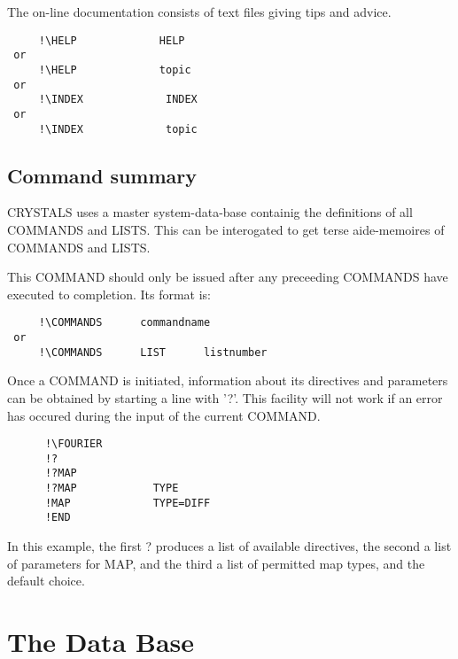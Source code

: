 \documentclass[10pt,a4paper]{report}
\begin{document}
The on-line documentation consists of text files giving tips and
advice.

\small\begin{verbatim}
     !\HELP             HELP
 or
     !\HELP             topic
 or
     !\INDEX             INDEX
 or
     !\INDEX             topic
\end{verbatim}\normalsize


\section{Command summary}



CRYSTALS uses a master system-data-base containig the definitions of all
 COMMANDS  and LISTS. This can be interogated to get terse aide-memoires
 of COMMANDS and LISTS.



\bigskip{}


This COMMAND should only be issued after any preceeding COMMANDS have
 executed to completion. Its format is:

\small\begin{verbatim}
     !\COMMANDS      commandname
 or
     !\COMMANDS      LIST      listnumber
\end{verbatim}\normalsize





\bigskip{}



Once a COMMAND is  initiated, information about its directives and
 parameters can be obtained by starting a line with '?'. This facility will
 not work if an error has occured during the input of the current COMMAND.

\small\begin{verbatim}
      !\FOURIER
      !?
      !?MAP
      !?MAP            TYPE
      !MAP             TYPE=DIFF
      !END
\end{verbatim}\normalsize




In this example, the first ? produces a list of available directives, the
 second a list of parameters for MAP, and the third a list of permitted map
 types, and the default choice.




\chapter{The Data Base}
\end{document}
